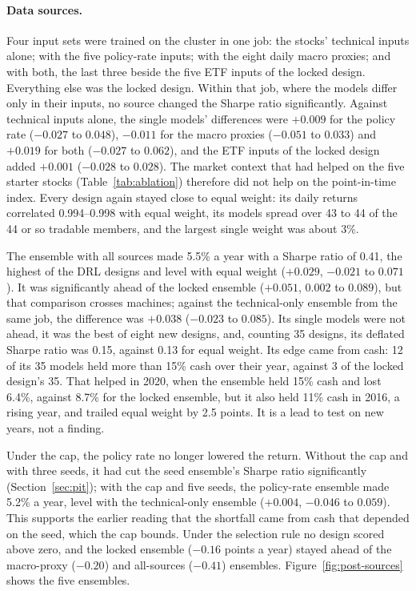 \paragraph{Data sources.} Four input sets were trained on the cluster in one job: the stocks' technical
inputs alone; with the five policy-rate inputs; with the eight daily macro proxies; and with both, the
last three beside the five ETF inputs of the locked design. Everything else was the locked design.
Within that job, where the models differ only in their inputs, no source changed the Sharpe ratio
significantly. Against technical inputs alone, the single models' differences were $+0.009$ for the
policy rate ($-0.027$ to $0.048$), $-0.011$ for the macro proxies ($-0.051$ to $0.033$) and $+0.019$ for
both ($-0.027$ to $0.062$), and the ETF inputs of the locked design added $+0.001$ ($-0.028$ to $0.028$).
The market context that had helped on the five starter stocks (Table~\ref{tab:ablation}) therefore did
not help on the point-in-time index. Every design again stayed close to equal weight: its daily returns
correlated 0.994--0.998 with equal weight, its models spread over 43 to 44 of the 44 or so tradable
members, and the largest single weight was about 3\%.

The ensemble with all sources made 5.5\% a year with a Sharpe ratio of 0.41, the highest of the DRL
designs and level with equal weight ($+0.029$, $-0.021$ to $0.071$). It was significantly ahead of the
locked ensemble ($+0.051$, $0.002$ to $0.089$), but that comparison crosses machines; against the
technical-only ensemble from the same job, the difference was $+0.038$ ($-0.023$ to $0.085$). Its single
models were not ahead, it was the best of eight new designs, and, counting 35 designs, its deflated
Sharpe ratio was 0.15, against 0.13 for equal weight. Its edge came from cash: 12 of its 35 models held
more than 15\% cash over their year, against 3 of the locked design's 35. That helped in 2020, when the
ensemble held 15\% cash and lost 6.4\%, against 8.7\% for the locked ensemble, but it also held 11\% cash
in 2016, a rising year, and trailed equal weight by 2.5 points. It is a lead to test on new years, not a
finding.

Under the cap, the policy rate no longer lowered the return. Without the cap and with three seeds, it
had cut the seed ensemble's Sharpe ratio significantly (Section~\ref{sec:pit}); with the cap and five
seeds, the policy-rate ensemble made 5.2\% a year, level with the technical-only ensemble ($+0.004$,
$-0.046$ to $0.059$). This supports the earlier reading that the shortfall came from cash that depended
on the seed, which the cap bounds. Under the selection rule no design scored above zero, and the locked
ensemble ($-0.16$ points a year) stayed ahead of the macro-proxy ($-0.20$) and all-sources ($-0.41$)
ensembles. Figure~\ref{fig:post-sources} shows the five ensembles.

